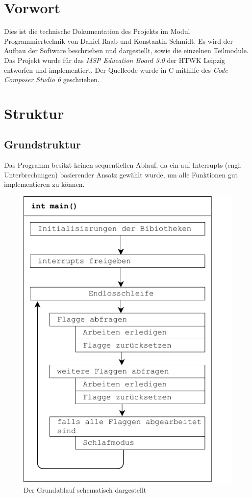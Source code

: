 \section{Vorwort}
Dies ist die technische Dokumentation des Projekts im Modul Programmiertechnik von Daniel Raab und Konstantin Schmidt. Es wird der Aufbau der Software beschrieben und dargestellt, sowie die einzelnen Teilmodule. Das Projekt wurde für das \emph{MSP Education Board 3.0} der HTWK Leipzig entworfen und implementiert. Der Quellcode wurde in C mithilfe des \emph{Code Composer Studio 6} geschrieben.
\section{Struktur}
\subsection{Grundstruktur}
\label{sub:grundstruktur}
Das Programm besitzt keinen sequentiellen Ablauf, da ein auf Interrupts (engl. Unterbrechungen) basierender Ansatz gewählt wurde, um alle Funktionen gut implementieren zu können.
\begin{figure}[h]
    \centering
    \includegraphics{main_diagram.pdf}
    \caption{Der Grundablauf schematisch dargestellt}
    \label{img:grundablauf}
\end{figure}

